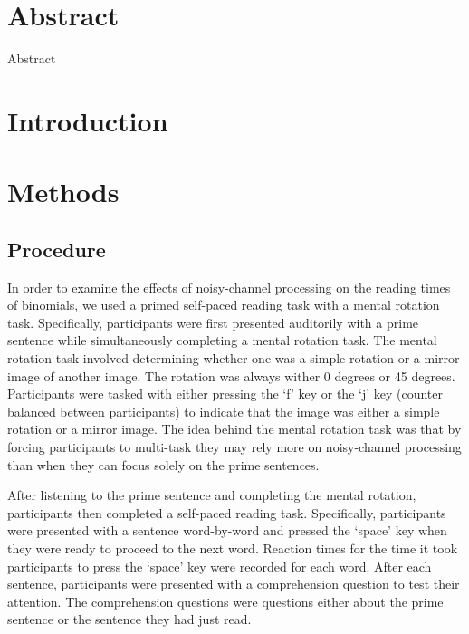\documentclass[
  12pt,
]{scrartcl}
\renewcommand*\contentsname{Table of contents}
\newcommand\contentsname{Table of contents}
\begin{document}
\setcounter{page}{\value{savedpage}} %
\clearpage

\renewcommand*\contentsname{Table of contents}
{
\setcounter{tocdepth}{3}
\tableofcontents
}

\newpage

\doublespacing

\setlength{\parindent}{4em}

\section*{Abstract}\label{sec-abstract}

Abstract

\newpage


\section{Introduction}\label{introduction}

\section{Methods}\label{methods}

\subsection{Procedure}\label{procedure}

In order to examine the effects of noisy-channel processing on the
reading times of binomials, we used a primed self-paced reading task
with a mental rotation task. Specifically, participants were first
presented auditorily with a prime sentence while simultaneously
completing a mental rotation task. The mental rotation task involved
determining whether one was a simple rotation or a mirror image of
another image. The rotation was always wither 0 degrees or 45 degrees.
Participants were tasked with either pressing the `f' key or the `j' key
(counter balanced between participants) to indicate that the image was
either a simple rotation or a mirror image. The idea behind the mental
rotation task was that by forcing participants to multi-task they may
rely more on noisy-channel processing than when they can focus solely on
the prime sentences.

After listening to the prime sentence and completing the mental
rotation, participants then completed a self-paced reading task.
Specifically, participants were presented with a sentence word-by-word
and pressed the `space' key when they were ready to proceed to the next
word. Reaction times for the time it took participants to press the
`space' key were recorded for each word. After each sentence,
participants were presented with a comprehension question to test their
attention. The comprehension questions were questions either about the
prime sentence or the sentence they had just read.
\end{document}

